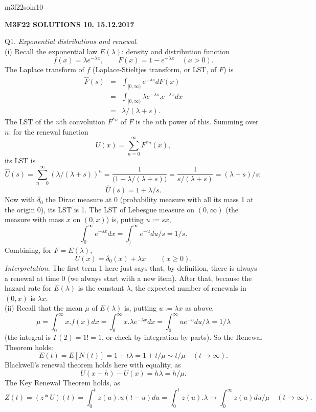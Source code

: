 \documentclass[12pt]{article}
\begin{document}
\def\R{\mathbb{R}}
\def\C{\mathbb{C}}
\def\Z{\mathbb{Z}}
\def\N{\mathbb{N}}
\def\Q{\mathbb{Q}}
\def\D{\mathbb{D}}
\def\Sp{{\mathbb{S}}}
\def\T{\mathbb{T}}
\def\H{\mathbb{H}}
\def\hb{\hfil \break}
\def\ni{\noindent}
\def\i{\indent}
\def\a{\alpha}
\def\b{\beta}
\def\e{\epsilon}
\def\d{\delta}
\def\D{\Delta}
\def\G{\Gamma}
\def\g{\gamma}
\def\l{\lambda}
\def\m{\mu}
\def\s{\sigma}
\def\Si{\Sigma}
\def\th{\theta}
\def\z{\zeta}
\def\p{\phi}
\def\o{\omega}
\def\O{\Omega}
\def\t{\tau}
\def\L{\it \char'44}
\def\F{\mathcal{F}}
\def\B{\mathcal{B}}
\def\C{\mathcal{C}}
\def\half{\frac{1}{2}}
\def\qq{\qquad}
\def\ti{\tilde}
\ni m3f22soln10 \\
\begin{center}
{\bf M3F22 SOLUTIONS 10.  15.12.2017} 
\end{center}

\ni Q1.  {\it Exponential distributions and renewal}. \\
(i) Recall the exponential law $E(\l)$: density and distribution function 
$$
f(x) = \l e^{-\l x}, \qquad F(x) = 1 - e^{-\l x} \quad (x > 0).
$$
The Laplace transform of $f$ (Laplace-Stieltjes transform, or LST, of $F$) is
\begin{eqnarray*}
\hat F(s) 
&=& \int_{[0,\infty)} e^{-\l s} dF(x) \\
&=& \int_{[0,\infty)}\l  e^{-\l s}.e^{-\l x} dx \\
&=& \l/(\l + s).
\end{eqnarray*}
The LST of the $n$th convolution $F^{\ast n}$ of $F$ is the $n$th power of this.  Summing over $n$: for the renewal function
$$
U(x) = \sum_{n=0}^{\infty} F^{\ast n}(x),
$$
its LST is
$$
\hat U(s) 
= \sum_{n=0}^{\infty} (\l/(\l + s))^n 
= \frac{1}{\bigl( 1 - \l/(\l + s) \bigr)} 
= \frac{1}{s/(\l + s)} 
= (\l + s)/s: 
$$
$$
\hat U(s) = 1 + \l/s.
$$
Now with ${\delta}_0$ the Dirac measure at 0 (probability measure with all its mass 1 at the origin 0), its LST is 1.  The LST of Lebesgue measure on $(0,\infty)$ (the measure with mass $x$ on $(0,x)$) is, putting $u := sx$,
$$\int_0^{\infty} e^{-sx} dx = \int_)^{\infty} e^{-u} du/s = 1/s.
$$
Combining, for $F = E(\l)$,
$$
U(x) = {\delta}_0(x) + \l x \qquad (x \geq 0).
$$
{\it Interpretation}.  The first term 1 here just says that, by definition, there is always a renewal at time 0 (we always start with a new item).  After that, because the hazard rate for $E(\l)$ is the constant $\l$, the expected number of renewals in $(0,x)$ is $\l x$. \\
(ii) Recall that the mean $\mu$ of $E(\l)$ is, putting $u := \l x$ as above,
$$
\mu = \int_0^{\infty} x.f(x) dx = \int_0^{\infty} x.\l e^{-\l x} dx = \int_0^{\infty} u e^{-u} du/\l = 1/\l
$$
(the integral is $\Gamma(2) = 1! = 1$, or check by integration by parts).  So the Renewal Theorem holds:
$$
E(t) = E[N(t)] = 1 + t \l = 1 + t/\mu \sim t/\mu \quad (t \to \infty).
$$
 Blackwell's renewal theorem holds here with equality, as 
$$
U(x+h) - U(x) = h \l = h/\mu.
$$
The Key Renewal Theorem holds, as
$$
Z(t) = (z \ast U)(t) = \int_0^t z(u).u(t-u) du = \int_0^t z(u). \l \to \int_0^{\infty} z(u)du/\mu \quad (t \to \infty).
$$
\end{document}
